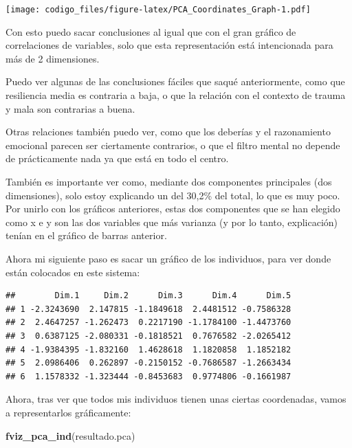\documentclass[]{article}
\newenvironment{Shaded}{\begin{snugshade}}{\end{snugshade}}
\newcommand{\KeywordTok}[1]{\textcolor[rgb]{0.13,0.29,0.53}{\textbf{#1}}}
\newcommand{\CommentTok}[1]{\textcolor[rgb]{0.56,0.35,0.01}{\textit{#1}}}
\newcommand{\OperatorTok}[1]{\textcolor[rgb]{0.81,0.36,0.00}{\textbf{#1}}}
\newcommand{\NormalTok}[1]{#1}
\begin{document}
\texttt{[image: codigo\_files/figure-latex/PCA\_Coordinates\_Graph-1.pdf]}

Con esto puedo sacar conclusiones al igual que con el gran gráfico de
correlaciones de variables, solo que esta representación está
intencionada para más de 2 dimensiones.

Puedo ver algunas de las conclusiones fáciles que saqué anteriormente,
como que resiliencia media es contraria a baja, o que la relación con el
contexto de trauma y mala son contrarias a buena.

Otras relaciones también puedo ver, como que los deberías y el
razonamiento emocional parecen ser ciertamente contrarios, o que el
filtro mental no depende de prácticamente nada ya que está en todo el
centro.

También es importante ver como, mediante dos componentes principales
(dos dimensiones), solo estoy explicando un del 30,2\% del total, lo que
es muy poco. Por unirlo con los gráficos anteriores, estas dos
componentes que se han elegido como x e y son las dos variables que más
varianza (y por lo tanto, explicación) tenían en el gráfico de barras
anterior.

Ahora mi siguiente paso es sacar un gráfico de los individuos, para ver
donde están colocados en este sistema:

\begin{Shaded}
\end{Shaded}

\begin{verbatim}
##        Dim.1     Dim.2      Dim.3      Dim.4      Dim.5
## 1 -2.3243690  2.147815 -1.1849618  2.4481512 -0.7586328
## 2  2.4647257 -1.262473  0.2217190 -1.1784100 -1.4473760
## 3  0.6387125 -2.080331 -0.1818521  0.7676582 -2.0265412
## 4 -1.9384395 -1.832160  1.4628618  1.1820858  1.1852182
## 5  2.0986406  0.262897 -0.2150152 -0.7686587 -1.2663434
## 6  1.1578332 -1.323444 -0.8453683  0.9774806 -0.1661987
\end{verbatim}

Ahora, tras ver que todos mis individuos tienen unas ciertas
coordenadas, vamos a representarlos gráficamente:

\begin{Shaded}
\begin{Highlighting}[]
\KeywordTok{fviz_pca_ind}\NormalTok{(resultado.pca)}
\end{Highlighting}
\end{Shaded}
\end{document}
